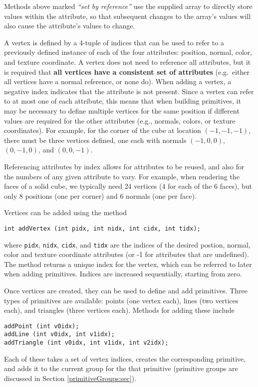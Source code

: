 \begin{sideblock}
Methods above marked {\it ``set by reference''} use the supplied array to
directly store values within the attribute, so that subsequent changes to
the array's values will also cause the attribute's values to change.
\end{sideblock}

A vertex is defined by a 4-tuple of indices that can be used to refer
to a previously defined instance of each of the four attributes:
position, normal, color, and texture coordinate. A vertex does not
need to reference all attributes, but it is required that {\bf
all vertices have a consistent set of attributes} (e.g.~either all
vertices have a normal reference, or none do).  When adding a vertex, a
negative index indicates that the attribute is not present. Since a
vertex can refer to at most one of each attribute, this means that
when building primitives, it may be necessary to define multiple
vertices for the same position if different values are required for
the other attributes (e.g., normals, colors, or texture coordinates).
For example, for the corner of the cube at location $(-1,-1,-1)$,
there must be three vertices defined, one each with normals
$(-1,0,0)$, $(0,-1,0)$, and $(0,0,-1)$.

Referencing attributes by index allows for attributes to be reused,
and also for the numbers of any given attribute to vary. For example,
when rendering the faces of a solid cube, we typically need 24
vertices (4 for each of the 6 faces), but only 8 positions (one per
corner) and 6 normals (one per face). 

Vertices can be added using the 
 method
%
\begin{lstlisting}[]
int addVertex (int pidx, int nidx, int cidx, int tidx);
\end{lstlisting}
%
where {\tt pidx}, {\tt nidx}, {\tt cidx}, and {\tt tidx} are the
indices of the desired postion, normal, color and texture coordinate
attributes (or -1 for attributes that are undefined). The method
returns a unique index for the vertex, which can be referred to later
when adding primitives. Indices are increased sequentially, starting
from zero. 

Once vertices are created, they can be used to define and add
primitives. Three types of primitives are available: points (one
vertex each), lines (two vertices each), and triangles (three vertices
each). Methods for adding these include
%
\begin{lstlisting}[]
addPoint (int v0idx);
addLine (int v0idx, int v1idx);
addTriangle (int v0idx, int v1idx, int v2idx);
\end{lstlisting}
%
Each of these takes a set of vertex indices, creates the corresponding
primitive, and adds it to the current group for the that primitive
(primitive groups are discussed in Section \ref{primitiveGroups:sec}).

